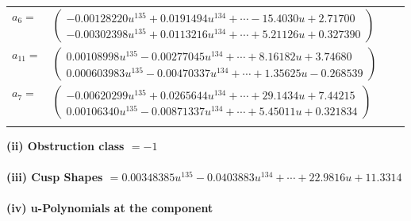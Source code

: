 \documentclass[1p]{elsarticle_modified}
\theoremstyle{definition}
\begin{document}
\begin{tabular}{m{7pt} m{180pt} m{7pt} m{180pt} }
\flushright $a_{6}=$&$\begin{pmatrix}-0.00128220 u^{135}+0.0191494 u^{134}+\cdots-15.4030 u+2.71700\\-0.00302398 u^{135}+0.0113216 u^{134}+\cdots+5.21126 u+0.327390\end{pmatrix}$ \\
\flushright $a_{11}=$&$\begin{pmatrix}0.00108998 u^{135}-0.00277045 u^{134}+\cdots+8.16182 u+3.74680\\0.000603983 u^{135}-0.00470337 u^{134}+\cdots+1.35625 u-0.268539\end{pmatrix}$ \\
\flushright $a_{7}=$&$\begin{pmatrix}-0.00620299 u^{135}+0.0265644 u^{134}+\cdots+29.1434 u+7.44215\\0.00106340 u^{135}-0.00871337 u^{134}+\cdots+5.45011 u+0.321834\end{pmatrix}$\\&\end{tabular}
\flushleft \textbf{(ii) Obstruction class $= -1$}\\~\\
\flushleft \textbf{(iii) Cusp Shapes $= 0.00348385 u^{135}-0.0403883 u^{134}+\cdots+22.9816 u+11.3314$}\\~\\
\newpage\renewcommand{\arraystretch}{1}
\flushleft \textbf{(iv) u-Polynomials at the component}\newline \\
\end{document}
